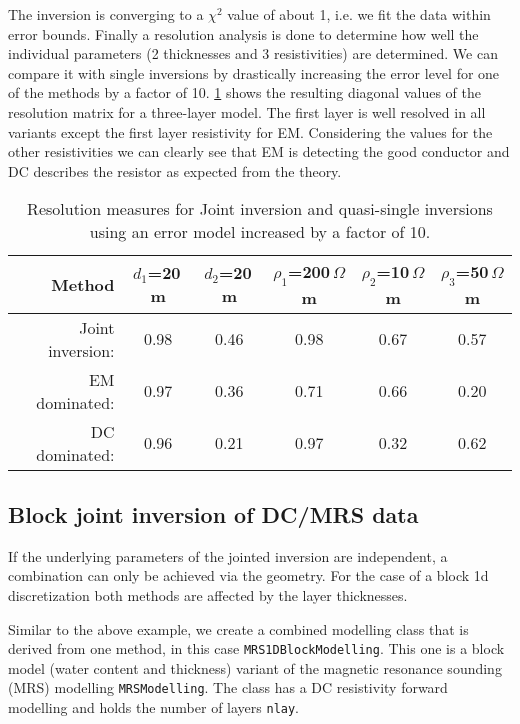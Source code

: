 The inversion is converging to a $\chi^2$ value of about 1, i.e. we fit the data within error bounds.
Finally a resolution analysis is done to determine how well the individual parameters (2 thicknesses and 3 resistivities) are determined.
We can compare it with single inversions by drastically increasing the error level for one of the methods by a factor of 10.
\ref{tab:dcemresolution} shows the resulting diagonal values of the resolution matrix for a three-layer model.
The first layer is well resolved in all variants except the first layer resistivity for EM.
Considering the values for the other resistivities we can clearly see that EM is detecting the good conductor and DC describes the resistor as expected from the theory.

\begin{table}[h]%
\centering
\begin{tabular}{r|ccccc}
Method & $d_1$=20\,m & $d_2$=20\,m & $\rho_1$=200\,$\Omega$m & $\rho_2$=10\,$\Omega$m & $\rho_3$=50\,$\Omega$m \\ \hline
Joint inversion: & 0.98 & 0.46 & 0.98 & 0.67 & 0.57 \\
EM dominated:    & 0.97 & 0.36 & 0.71 & 0.66 & 0.20 \\
DC dominated:    & 0.96 & 0.21 & 0.97 & 0.32 & 0.62  
\end{tabular}
\caption{Resolution measures for Joint inversion and quasi-single inversions using an error model increased by a factor of 10.}\label{tab:dcemresolution}
\end{table}

\subsection{Block joint inversion of DC/MRS data}\label{sec:blockjoint}
If the underlying parameters of the jointed inversion are independent, a combination can only be achieved via the geometry.
For the case of a block 1d discretization both methods are affected by the layer thicknesses.

Similar to the above example, we create a combined modelling class that is derived from one method, in this case \lstinline|MRS1DBlockModelling|.
This one is a block model (water content and thickness) variant of the magnetic resonance sounding (MRS) modelling \lstinline|MRSModelling|.
The class has a DC resistivity forward modelling and holds the number of layers \lstinline|nlay|.

